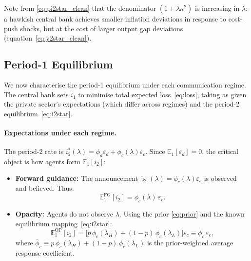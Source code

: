 \noindent Note from \eqref{eq:pi2star_clean} that the denominator $(1+\lambda\kappa^2)$
is increasing in $\lambda$: a hawkish central bank achieves smaller inflation
deviations in response to cost-push shocks, but at the cost of larger output gap
deviations (equation~\eqref{eq:y2star_clean}).

\subsection{Period-1 Equilibrium}
\label{sec:period1}

We now characterise the period-1 equilibrium under each communication regime. The
central bank sets $i_1$ to minimise total expected loss~\eqref{eq:loss}, taking as
given the private sector's expectations (which differ across regimes) and the
period-2 equilibrium~\eqref{eq:i2star}.

\paragraph{Expectations under each regime.}
The period-2 rate is $i_2^*(\lambda) = \phi_d\varepsilon_d + \phi_c(\lambda)\varepsilon_c$.
Since $\mathbb{E}_1[\varepsilon_d] = 0$, the critical object is how agents form
$\mathbb{E}_1[i_2]$:

\begin{itemize}
  \item \textbf{Forward guidance:} The announcement $\hat{\imath}_2(\lambda) =
        \phi_c(\lambda)\varepsilon_c$ is observed and believed. Thus:
        \begin{equation}
          \mathbb{E}_1^{\mathrm{FG}}[i_2] = \phi_c(\lambda)\,\varepsilon_c.
          \label{eq:E_i2_FG}
        \end{equation}

  \item \textbf{Opacity:} Agents do not observe $\lambda$. Using the prior
        \eqref{eq:prior} and the known equilibrium mapping~\eqref{eq:i2star}:
        \begin{equation}
          \mathbb{E}_1^{\mathrm{OP}}[i_2]
            = \bigl[p\,\phi_c(\lambda_H) + (1-p)\,\phi_c(\lambda_L)\bigr]\varepsilon_c
            \equiv \bar{\phi}_c\,\varepsilon_c,
          \label{eq:E_i2_OP}
        \end{equation}
        where $\bar{\phi}_c \equiv p\,\phi_c(\lambda_H)+(1-p)\,\phi_c(\lambda_L)$
        is the prior-weighted average response coefficient.
\end{itemize}

